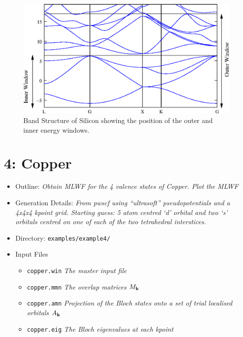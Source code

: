 \documentclass[a4paper,11pt,twoside]{article}
\begin{document}
\begin{figure}[h]
\begin{center}
\includegraphics{si.eps}
\caption{Band Structure of Silicon showing the position of the outer and inner energy windows.}
\label{fig:si.bnd}
\end{center}
\end{figure}

\cleardoublepage


\section*{4: Copper}

\begin{itemize}
\item{Outline: \it{Obtain MLWF for the 4 valence states of Copper. Plot the MLWF}}
\item{Generation Details: \it{From pwscf using ``ultrasoft'' pseudopotentials
and a 4x4x4 kpoint grid. Starting guess: 5 atom centred `d' orbital and two `s' orbitals centred on 
one of each of the two tetrahedral interstices.}}
\item{Directory: {\tt examples/example4/}}
\item{Input Files}
\begin{itemize}
\item{ {\tt copper.win}  {\it The master input file}}
\item{ {\tt copper.mmn}  {\it The overlap matrices $M_{{\bf k}}$}}
\item{ {\tt copper.amn}  {\it Projection of the Bloch states onto a set of trial localised orbitals $A_{{\bf k}}$}}
\item{ {\tt copper.eig}  {\it The Bloch eigenvalues at each kpoint}}
\end{itemize}

\end{itemize}
\end{document}
